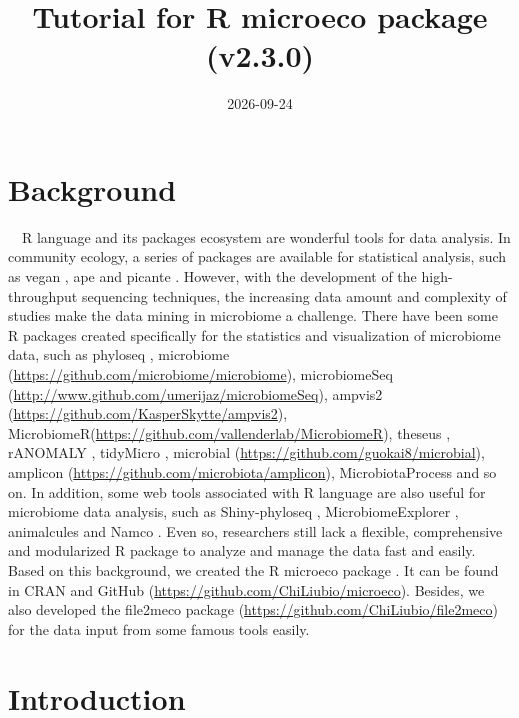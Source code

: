 \documentclass[
]{book}
\title{Tutorial for R microeco package (v2.3.0)}
\author{}
\date{\vspace{-2.5em}2026-09-24}
\begin{document}
\maketitle

{
\setcounter{tocdepth}{1}
\tableofcontents
}
\chapter{Background}\label{background}

　R language \citep{R-base} and its packages ecosystem are wonderful tools for data analysis.
In community ecology, a series of packages are available for statistical analysis,
such as vegan \citep{Jari_vegan_2019}, ape \citep{Paradis_ape_2018} and picante \citep{Picante_Kembel_2010}.
However, with the development of the high-throughput sequencing techniques,
the increasing data amount and complexity of studies make the data mining in microbiome a challenge.
There have been some R packages created specifically for the statistics and visualization of microbiome data,
such as phyloseq \citep{Mcmurdie_phyloseq_2013},
microbiome (\url{https://github.com/microbiome/microbiome}), microbiomeSeq (\url{http://www.github.com/umerijaz/microbiomeSeq}),
ampvis2 (\url{https://github.com/KasperSkytte/ampvis2}), MicrobiomeR(\url{https://github.com/vallenderlab/MicrobiomeR}),
theseus \citep{Price_theseus_2018}, rANOMALY \citep{Theil_rANOMALY_2021},
tidyMicro \citep{Carpenter_tidyMicro_2021}, microbial (\url{https://github.com/guokai8/microbial}),
amplicon (\url{https://github.com/microbiota/amplicon}),
MicrobiotaProcess \citep{Xu_MicrobiotaProcess_2023}
and so on.
In addition, some web tools associated with R language are also useful for microbiome data analysis,
such as Shiny-phyloseq \citep{McMurdie_Shiny_2015}, MicrobiomeExplorer \citep{Reeder_MicrobiomeExplorer_2021},
animalcules \citep{Zhao_animalcules_2021} and Namco \citep{Dietrich_Namco_2022}.
Even so, researchers still lack a flexible, comprehensive and modularized R package to analyze and manage the data fast and easily.
Based on this background, we created the R microeco package \citep{Liu_microeco_2021, Liu_workflow_2026, Liu_microeco2_2026}.
It can be found in CRAN and GitHub (\url{https://github.com/ChiLiubio/microeco}).
Besides, we also developed the file2meco package (\url{https://github.com/ChiLiubio/file2meco}) for the data input from some famous tools easily.

\chapter{Introduction}\label{intro}
\end{document}
